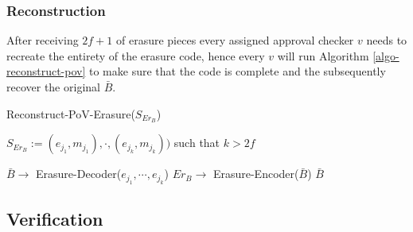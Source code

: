 


\subsubsection{Reconstruction}
\label{}
After receiving $2f+1$ of erasure pieces every assigned approval checker $v$
needs to recreate the entirety of the erasure code, hence every $v$ will run
Algorithm \ref{algo-reconstruct-pov} to make sure that the code is complete and
the subsequently recover the original $\bar{B}$.

\begin{algorithm}[H]
  \caption[Reconstruct-PoV-Erasure]{\sc Reconstruct-PoV-Erasure($S_{Er_B}$)}
  \label{algo-reconstruct-pov-erasure}
  \begin{algorithmic}[1]
  \Require
    $S_{Er_B} := {(e_{j_1}, m_{j_1}),\cdot,(e_{j_k}, m_{j_k}))}$ such that $k > 2f$

    \State $\bar{B} \rightarrow$ {\sc Erasure-Decoder}(${e_{j_1},\cdots, e_{j_k}}$)
        \State \Return
    \EndIf
    \State $Er_B \rightarrow$ {\sc Erasure-Encoder}($\bar{B}$)
      \State \Return
    \EndIf
    \State \Return $\bar{B}$
  \end{algorithmic}
\end{algorithm}

\subsection{Verification}

